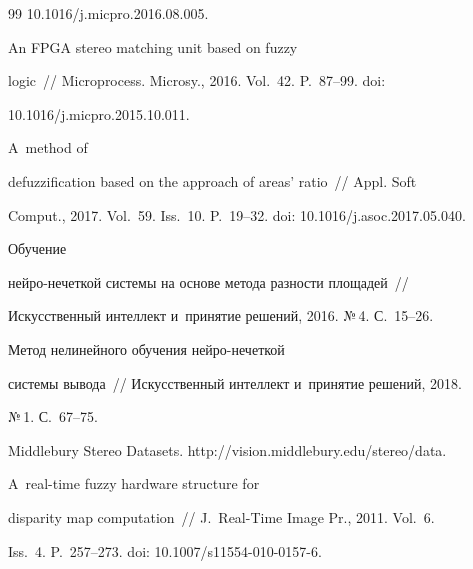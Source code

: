{{\begin{thebibliography}{99}
10.1016/j.micpro.2016.08.005.







 An FPGA stereo matching unit based on fuzzy 


logic~/\!\!/ Microprocess. Microsy., 2016. Vol.~42. P.~87--99. doi: 


10.1016/j.micpro.2015.10.011.







 A~method of 


defuzzification based on the approach of areas' ratio~/\!\!/ Appl. Soft 


Comput., 2017. Vol.~59. Iss.~10. P.~19--32. doi: 10.1016/j.asoc.2017.05.040.










 Обучение  


ней\-ро-не\-чет\-кой системы на основе метода разности площадей~/\!\!/ 


Искусственный интеллект и~принятие решений, 2016. №\,4. С.~15--26.




 Метод нелинейного обучения ней\-ро-не\-чет\-кой  


сис\-те\-мы вывода~/\!\!/ Искусственный интеллект и~принятие решений, 2018. 


№\,1. С.~67--75.




Middlebury Stereo Datasets. {\sf http://vision.middlebury.edu/stereo/data}.







 A~real-time fuzzy hardware structure for 


disparity map computation~/\!\!/ J.~Real-Time Image Pr., 2011. Vol.~6. 


Iss.~4. P.~257--273. doi: 10.1007/s11554-010-0157-6.





        \end{thebibliography}


} }








